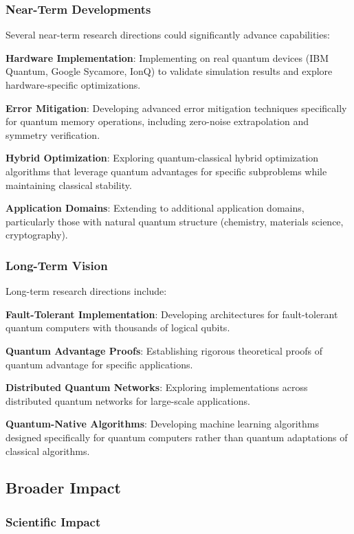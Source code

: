 \subsubsection{Near-Term Developments}

Several near-term research directions could significantly advance \qmann capabilities:

\textbf{Hardware Implementation}: Implementing \qmann on real quantum devices (IBM Quantum, Google Sycamore, IonQ) to validate simulation results and explore hardware-specific optimizations.

\textbf{Error Mitigation}: Developing advanced error mitigation techniques specifically for quantum memory operations, including zero-noise extrapolation and symmetry verification.

\textbf{Hybrid Optimization}: Exploring quantum-classical hybrid optimization algorithms that leverage quantum advantages for specific subproblems while maintaining classical stability.

\textbf{Application Domains}: Extending \qmann to additional application domains, particularly those with natural quantum structure (chemistry, materials science, cryptography).

\subsubsection{Long-Term Vision}

Long-term research directions include:

\textbf{Fault-Tolerant Implementation}: Developing \qmann architectures for fault-tolerant quantum computers with thousands of logical qubits.

\textbf{Quantum Advantage Proofs}: Establishing rigorous theoretical proofs of quantum advantage for specific \qmann applications.

\textbf{Distributed Quantum Networks}: Exploring \qmann implementations across distributed quantum networks for large-scale applications.

\textbf{Quantum-Native Algorithms}: Developing machine learning algorithms designed specifically for quantum computers rather than quantum adaptations of classical algorithms.

\subsection{Broader Impact}

\subsubsection{Scientific Impact}

